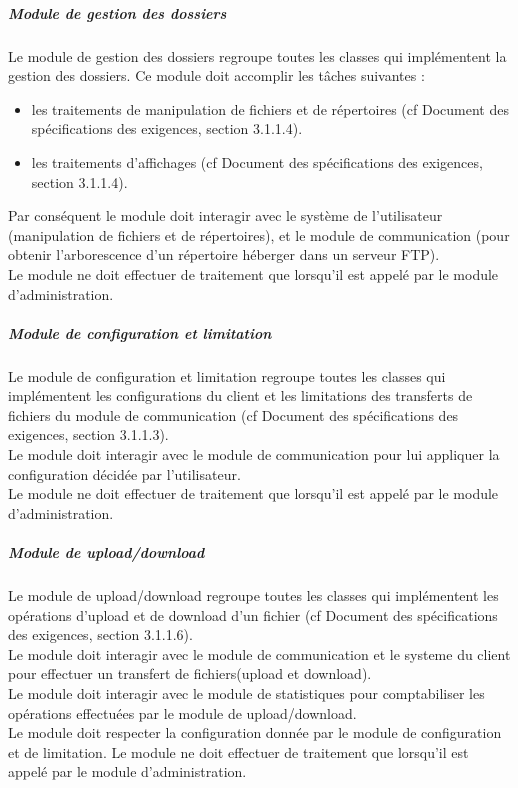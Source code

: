 \documentclass[10pt,a4paper]{report}
\begin{document}
	
				\subparagraph{Module de gestion des dossiers}
				\begin{flushleft}
				Le module de gestion des dossiers regroupe toutes les classes qui implémentent la gestion des dossiers. Ce module doit accomplir les tâches suivantes :
				\begin{itemize}
					\item les traitements de manipulation de fichiers et de répertoires (cf Document des spécifications des exigences, section 3.1.1.4).
					\item les traitements d'affichages (cf Document des spécifications des exigences, section 3.1.1.4).
				\end{itemize}
				
				Par conséquent le module doit interagir avec le système de l'utilisateur (manipulation de fichiers et de répertoires), et le module de communication (pour obtenir l'arborescence d'un répertoire héberger dans un serveur FTP).\\
				Le module ne doit effectuer de traitement que lorsqu'il est appelé par le module d'administration.
				\end{flushleft}
	
				\subparagraph{Module de configuration et limitation}	
				\begin{flushleft}
				Le module de configuration et limitation regroupe toutes les classes qui implémentent les configurations du client et les limitations des transferts de fichiers du module de communication (cf Document des spécifications des exigences, section 3.1.1.3).\\
				Le module doit interagir avec le module de communication pour lui appliquer la configuration décidée par l'utilisateur.\\
				Le module ne doit effectuer de traitement que lorsqu'il est appelé par le module d'administration.
				\end{flushleft}
	
				\subparagraph{Module de upload/download}
				\begin{flushleft}
				Le module de upload/download regroupe toutes les classes qui implémentent les opérations d'upload et de download d'un fichier (cf Document des spécifications des exigences, section 3.1.1.6). \\
				Le module doit interagir avec le module de communication et le systeme du client pour effectuer un transfert de fichiers(upload et download).\\
				Le module doit interagir avec le module de statistiques pour comptabiliser les opérations effectuées par le module de upload/download.\\
				Le module doit respecter la configuration donnée par le module de configuration et de limitation.
				Le module ne doit effectuer de traitement que lorsqu'il est appelé par le module d'administration.
				\end{flushleft}
	
\end{document}
